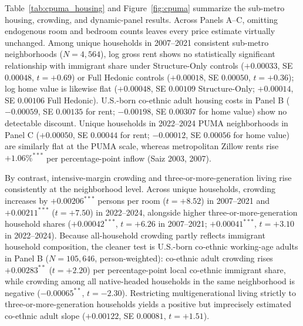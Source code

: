 \documentclass[11pt]{article}
\begin{document}
Table~\ref{tab:cpuma_housing} and Figure~\ref{fig:cpuma} summarize the sub-metro housing, crowding, and dynamic-panel results. Across Panels A--C, omitting endogenous room and bedroom counts leaves every price estimate virtually unchanged. Among unique households in 2007--2021 consistent sub-metro neighborhoods ($N = 4{,}564$), log gross rent shows no statistically significant relationship with immigrant share under Structure-Only controls ($+0.00033$, SE $0.00048$, $t = +0.69$) or Full Hedonic controls ($+0.00018$, SE $0.00050$, $t = +0.36$); log home value is likewise flat ($+0.00048$, SE $0.00109$ Structure-Only; $+0.00014$, SE $0.00106$ Full Hedonic). U.S.-born co-ethnic adult housing costs in Panel B ($-0.00059$, SE $0.00135$ for rent; $-0.00198$, SE $0.00307$ for home value) show no detectable discount. Unique households in 2022--2024 PUMA neighborhoods in Panel C ($+0.00050$, SE $0.00044$ for rent; $-0.00012$, SE $0.00056$ for home value) are similarly flat at the PUMA scale, whereas metropolitan Zillow rents rise $+1.06\%^{***}$ per percentage-point inflow (Saiz 2003, 2007).



By contrast, intensive-margin crowding and three-or-more-generation living rise consistently at the neighborhood level. Across unique households, crowding increases by $+0.00206^{***}$ persons per room ($t = +8.52$) in 2007--2021 and $+0.00211^{***}$ ($t = +7.50$) in 2022--2024, alongside higher three-or-more-generation household shares ($+0.00042^{***}$, $t = +6.26$ in 2007--2021; $+0.00041^{***}$, $t = +3.10$ in 2022--2024). Because all-household crowding partly reflects immigrant household composition, the cleaner test is U.S.-born co-ethnic working-age adults in Panel B ($N = 105{,}646$, person-weighted): co-ethnic adult crowding rises $+0.00283^{**}$ ($t = +2.20$) per percentage-point local co-ethnic immigrant share, while crowding among all native-headed households in the same neighborhood is negative ($-0.00065^{**}$, $t = -2.30$). Restricting multigenerational living strictly to three-or-more-generation households yields a positive but imprecisely estimated co-ethnic adult slope ($+0.00122$, SE $0.00081$, $t = +1.51$).
\end{document}
